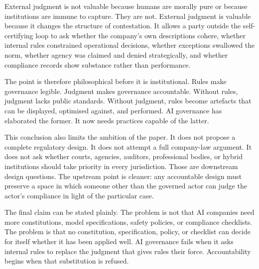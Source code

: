 \documentclass[11pt,a4paper]{article}
\begin{document}
External judgment is not valuable because humans are morally pure or because institutions are immune to capture. They are not. External judgment is valuable because it changes the structure of contestation. It allows a party outside the self-certifying loop to ask whether the company's own descriptions cohere, whether internal rules constrained operational decisions, whether exceptions swallowed the norm, whether agency was claimed and denied strategically, and whether compliance records show substance rather than performance.

The point is therefore philosophical before it is institutional. Rules make governance legible. Judgment makes governance accountable. Without rules, judgment lacks public standards. Without judgment, rules become artefacts that can be displayed, optimised against, and performed. AI governance has elaborated the former. It now needs practices capable of the latter.

This conclusion also limits the ambition of the paper. It does not propose a complete regulatory design. It does not attempt a full company-law argument. It does not ask whether courts, agencies, auditors, professional bodies, or hybrid institutions should take priority in every jurisdiction. Those are downstream design questions. The upstream point is cleaner: any accountable design must preserve a space in which someone other than the governed actor can judge the actor's compliance in light of the particular case.

The final claim can be stated plainly. The problem is not that AI companies need more constitutions, model specifications, safety policies, or compliance checklists. The problem is that no constitution, specification, policy, or checklist can decide for itself whether it has been applied well. AI governance fails when it asks internal rules to replace the judgment that gives rules their force. Accountability begins when that substitution is refused.



\end{document}
